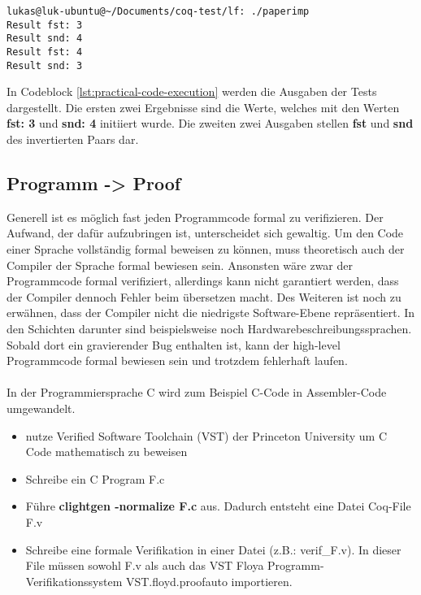 \begin{lstlisting}[language=coq,firstnumber=1,caption=Ocaml code ausführen,label=lst:practical-code-execution]
lukas@luk-ubuntu@~/Documents/coq-test/lf: ./paperimp
Result fst: 3 
Result snd: 4 
Result fst: 4 
Result snd: 3 
\end{lstlisting}
In Codeblock \ref{lst:practical-code-execution} werden die Ausgaben der Tests dargestellt. Die ersten zwei Ergebnisse sind die Werte, welches mit den Werten \textbf{fst: 3} und \textbf{snd: 4} initiiert wurde. Die zweiten zwei Ausgaben stellen \textbf{fst} und \textbf{snd} des invertierten Paars dar.

\subsection{Programm -> Proof}
Generell ist es möglich fast jeden Programmcode formal zu verifizieren. Der Aufwand, der dafür aufzubringen ist, unterscheidet sich gewaltig. Um den Code einer Sprache vollständig formal beweisen zu können, muss theoretisch auch der Compiler der Sprache formal bewiesen sein. Ansonsten wäre zwar der Programmcode formal verifiziert, allerdings kann nicht garantiert werden, dass der Compiler dennoch Fehler beim übersetzen macht. Des Weiteren ist noch zu erwähnen, dass der Compiler nicht die niedrigste Software-Ebene repräsentiert. In den Schichten darunter sind beispielsweise noch Hardwarebeschreibungssprachen. Sobald dort ein gravierender Bug enthalten ist, kann der high-level Programmcode formal bewiesen sein und trotzdem fehlerhaft laufen.\\
\\
In der Programmiersprache C wird zum Beispiel C-Code in Assembler-Code umgewandelt.

\begin{itemize}
	\item nutze Verified Software Toolchain (VST) der Princeton University um C Code mathematisch zu beweisen
\end{itemize}
\begin{itemize} 
	\item Schreibe ein C Program F.c
	\item Führe \textbf{clightgen -normalize F.c} aus. Dadurch entsteht eine Datei Coq-File F.v
	\item Schreibe eine formale Verifikation in einer Datei (z.B.: verif\_F.v). In dieser File müssen sowohl F.v als auch das VST Floya Programm-Verifikationssystem VST.floyd.proofauto importieren.\cite{Appel01:VST}
\end{itemize}

